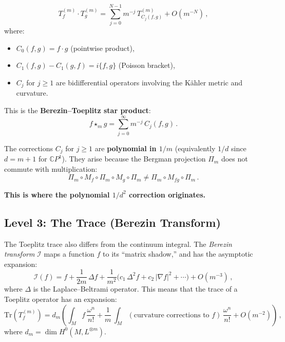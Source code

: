 \documentclass[12pt,a4paper]{article}
\theoremstyle{definition}
\begin{document}
\begin{tcolorbox}[title=Bordemann--Meinrenken--Schlichenmaier Product Formula]
\begin{equation}
T_f^{(m)} \cdot T_g^{(m)}
= \sum_{j=0}^{N-1} m^{-j}\,T_{C_j(f,g)}^{(m)} + O(m^{-N})\,,
\label{eq:BMS}
\end{equation}
where:
\begin{itemize}[nosep]
\item $C_0(f,g) = f \cdot g$ \quad (pointwise product),
\item $C_1(f,g) - C_1(g,f) = i\{f,g\}$ \quad (Poisson bracket),
\item $C_j$ for $j \geq 1$ are bidifferential operators involving the
  K\"ahler metric and curvature.
\end{itemize}
\end{tcolorbox}

\noindent
This is the \textbf{Berezin--Toeplitz star product}:
\begin{equation}
f \star_m g = \sum_{j=0}^{\infty} m^{-j}\,C_j(f,g)\,.
\end{equation}

The corrections $C_j$ for $j \geq 1$ are \textbf{polynomial in $1/m$}
(equivalently $1/d$ since $d = m + 1$ for $\mathbb{C}P^1$).
They arise because the Bergman projection $\Pi_m$ does not commute with
multiplication:
\begin{equation}
\Pi_m \circ M_f \circ \Pi_m \circ M_g \circ \Pi_m
\neq \Pi_m \circ M_{fg} \circ \Pi_m\,.
\end{equation}

\textbf{This is where the polynomial $1/d^2$ correction originates.}

\subsection{Level 3: The Trace (Berezin Transform)}

The Toeplitz trace also differs from the continuum integral.  The
\emph{Berezin transform} $\mathcal{I}$ maps a function $f$ to its
``matrix shadow,'' and has the asymptotic expansion:
\begin{equation}
\mathcal{I}(f) = f + \frac{1}{2m}\,\Delta f
+ \frac{1}{m^2}\bigl(c_1\,\Delta^2 f + c_2\,|\nabla f|^2 + \cdots\bigr)
+ O(m^{-3})\,,
\end{equation}
where $\Delta$ is the Laplace--Beltrami operator.  This means that
the trace of a Toeplitz operator has an expansion:
\begin{equation}
\mathrm{Tr}(T_f^{(m)}) = d_m \left(
\int_M f\,\frac{\omega^n}{n!}
+ \frac{1}{m}\,\int_M (\text{curvature corrections to }f)\,\frac{\omega^n}{n!}
+ O(m^{-2})
\right)\,,
\end{equation}
where $d_m = \dim H^0(M, L^{\otimes m})$.
\end{document}
